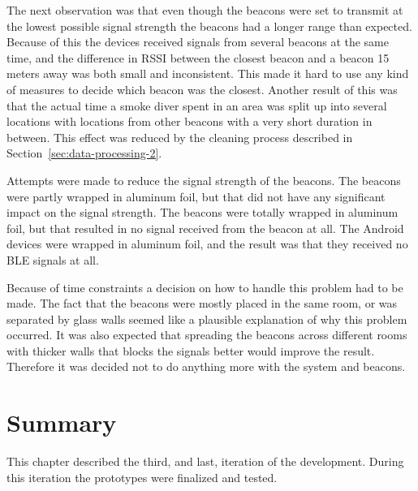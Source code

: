 \documentclass[../Main/thesis.tex]{subfiles}
\begin{document}
The next observation was that even though the beacons were set to transmit at the lowest possible signal strength the beacons had a longer range than expected.
Because of this the devices received signals from several beacons at the same time, and the difference in RSSI between the closest beacon and a beacon 15 meters away was both small and inconsistent.
This made it hard to use any kind of measures to decide which beacon was the closest.
Another result of this was that the actual time a smoke diver spent in an area was split up into several locations with locations from other beacons with a very short duration in between.
This effect was reduced by the cleaning process described in Section~\ref{sec:data-processing-2}.

Attempts were made to reduce the signal strength of the beacons.
The beacons were partly wrapped in aluminum foil, but that did not have any significant impact on the signal strength.
The beacons were totally wrapped in aluminum foil, but that resulted in no signal received from the beacon at all.
The Android devices were wrapped in aluminum foil, and the result was that they received no BLE signals at all.

Because of time constraints a decision on how to handle this problem had to be made.
The fact that the beacons were mostly placed in the same room, or was separated by glass walls seemed like a plausible explanation of why this problem occurred.
It was also expected that spreading the beacons across different rooms with thicker walls that blocks the signals better would improve the result.
Therefore it was decided not to do anything more with the system and beacons.

\section{Summary}
This chapter described the third, and last, iteration of the development.
During this iteration the prototypes were finalized and tested.

\blankpage
\end{document}
